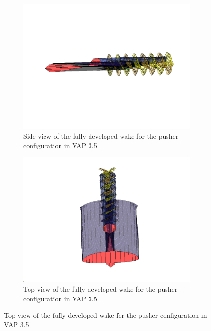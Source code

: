 \begin{figure}[H]
    \centering
    \begin{subfigure}[b]{0.467\textwidth}
      \centering
        \includegraphics[width=\textwidth]{05_Results/Figs/VAP/fullyDevelopedWake.png}
        \caption{Side view of the fully developed wake for the pusher configuration in VAP 3.5}
        \label{fig:TractorCofigurationWake}
         \end{subfigure}
          \begin{subfigure}[b]{0.467\textwidth}
      \centering
        \includegraphics[width=\textwidth]{05_Results/Figs/VAP/fullyDevelopedWake2.png}
        \caption{Top view of the fully developed wake for the pusher configuration in VAP 3.5}
        \label{fig:TractorCofigurationWake2}
         \end{subfigure}
\end{figure}



